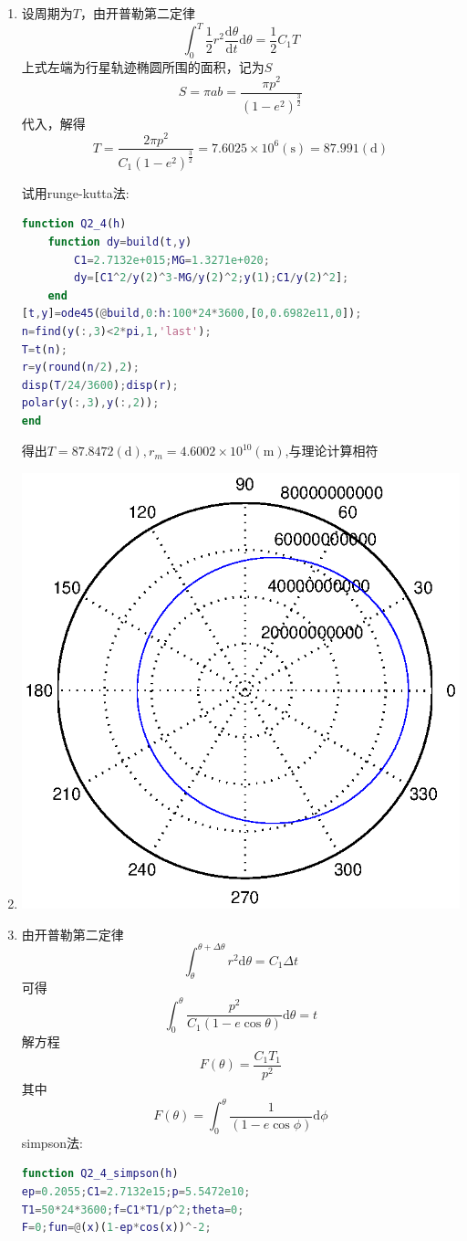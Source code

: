 \documentclass[12pt]{article}
\begin{document}
\begin{CJK*}{UTF8}{gbsn}
\begin{enumerate}
\item
设周期为$T$，由开普勒第二定律$$\int_0^T\dfrac{1}{2}r^2\dfrac{\mathrm{d}\theta}{\mathrm{d}t}\mathrm{d}\theta=\dfrac{1}{2}C_1T$$
上式左端为行星轨迹椭圆所围的面积，记为$S$
$$S=\pi ab=\frac{\pi p^2}{(1-e^2)^{\frac{3}{2}}}$$
代入，解得
$$T=\frac{2\pi p^2}{C_1(1-e^2)^\frac{3}{2}}=7.6025\times10^6(\mathrm{s})=87.991(\mathrm{d})$$

试用runge-kutta法:
\begin{lstlisting}[language=matlab]
function Q2_4(h)
    function dy=build(t,y)
        C1=2.7132e+015;MG=1.3271e+020;
        dy=[C1^2/y(2)^3-MG/y(2)^2;y(1);C1/y(2)^2];
    end
[t,y]=ode45(@build,0:h:100*24*3600,[0,0.6982e11,0]);
n=find(y(:,3)<2*pi,1,'last');
T=t(n);
r=y(round(n/2),2);
disp(T/24/3600);disp(r);
polar(y(:,3),y(:,2));
end
\end{lstlisting}
得出$T=87.8472(\mathrm{d}),r_m=4.6002\times10^{10}(\mathrm{m})$,与理论计算相符
\item
\includegraphics[scale=1]{Q2_3.eps}

\item
由开普勒第二定律$$\int_\theta^{\theta+\Delta\theta}r^2\mathrm{d}\theta=C_1\Delta t$$
可得$$\int_0^\theta\frac{p^2}{C_1(1-e\cos\theta)}\mathrm{d}\theta=t$$
解方程$$F(\theta)=\frac{C_1T_1}{p^2}$$
其中$$F(\theta)=\int_0^\theta\frac{1}{(1-e\cos\phi)}\mathrm{d}\phi$$
\newpage
simpson法:
\begin{lstlisting}[language=matlab]
function Q2_4_simpson(h)
ep=0.2055;C1=2.7132e15;p=5.5472e10;
T1=50*24*3600;f=C1*T1/p^2;theta=0;
F=0;fun=@(x)(1-ep*cos(x))^-2;


\end{lstlisting}
\end{enumerate}
\end{CJK*}
\end{document}
